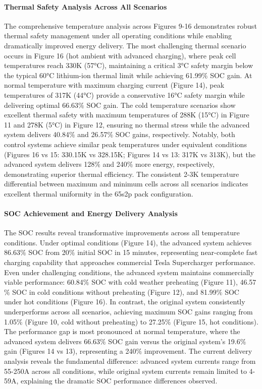\documentclass[conference]{IEEEtran}
\begin{document}
\paragraph{\textbf{Thermal Safety Analysis Across All Scenarios}}
The comprehensive temperature analysis across Figures 9-16 demonstrates robust thermal safety management under all operating conditions while enabling dramatically improved energy delivery. The most challenging thermal scenario occurs in Figure 16 (hot ambient with advanced charging), where peak cell temperatures reach 330K (57°C), maintaining a critical 3°C safety margin below the typical 60°C lithium-ion thermal limit while achieving 61.99$\%$ SOC gain.
At normal temperature with maximum charging current (Figure 14), peak temperatures of 317K (44°C) provide a conservative 16°C safety margin while delivering optimal 66.63$\%$ SOC gain. The cold temperature scenarios show excellent thermal safety with maximum temperatures of 288K (15°C) in Figure 11 and 278K (5°C) in Figure 12, ensuring no thermal stress while the advanced system delivers 40.84$\%$ and 26.57$\%$ SOC gains, respectively.
Notably, both control systems achieve similar peak temperatures under equivalent conditions (Figures 16 vs 15: 330.15K vs 328.15K; Figures 14 vs 13: 317K vs 313K), but the advanced system delivers 128$\%$ and 240$\%$ more energy, respectively, demonstrating superior thermal efficiency. The consistent 2-3K temperature differential between maximum and minimum cells across all scenarios indicates excellent thermal uniformity in the 65s2p pack configuration.

\paragraph{\textbf{SOC Achievement and Energy Delivery Analysis}}
The SOC results reveal transformative improvements across all temperature conditions. Under optimal conditions (Figure 14), the advanced system achieves 86.63$\%$ SOC from 20$\%$ initial SOC in 15 minutes, representing near-complete fast charging capability that approaches commercial Tesla Supercharger performance. Even under challenging conditions, the advanced system maintains commercially viable performance: 60.84$\%$ SOC with cold weather preheating (Figure 11), 46.57$\%$ SOC in cold conditions without preheating (Figure 12), and 81.99$\%$ SOC under hot conditions (Figure 16).
In contrast, the original system consistently underperforms across all scenarios, achieving maximum SOC gains ranging from 1.05$\%$ (Figure 10, cold without preheating) to 27.25$\%$ (Figure 15, hot conditions). The performance gap is most pronounced at normal temperature, where the advanced system delivers 66.63$\%$ SOC gain versus the original system's 19.6$\%$ gain (Figures 14 vs 13), representing a 240$\%$ improvement.
The current delivery analysis reveals the fundamental difference: advanced system currents range from 55-250A across all conditions, while original system currents remain limited to 4-59A, explaining the dramatic SOC performance differences observed.
\end{document}
